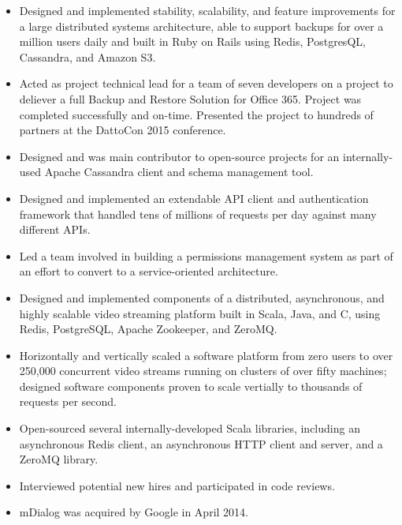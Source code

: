 \documentclass[11pt,a4paper,sans]{moderncv}
\begin{document}
{ \begin{itemize} \itemsep -1pt
  \item Designed and implemented stability, scalability, and feature improvements for a large distributed systems architecture, able to support backups for over a million users daily and built in Ruby on Rails using Redis, PostgresQL, Cassandra, and Amazon S3.
  \item Acted as project technical lead for a team of seven developers on a project to deliever a full Backup and Restore Solution for Office 365. Project was completed successfully and on-time. Presented the project to hundreds of partners at the DattoCon 2015 conference.
  \item Designed and was main contributor to open-source projects for an internally-used Apache Cassandra client and schema management tool.
  \item Designed and implemented an extendable API client and authentication framework that handled tens of millions of requests per day against many different APIs.
  \item Led a team involved in building a permissions management system as part of an effort to convert to a service-oriented architecture.
\end{itemize} }

{ \begin{itemize} \itemsep -1pt
  \item Designed and implemented components of a distributed, asynchronous, and highly scalable video streaming platform built in Scala, Java, and C, using Redis, PostgreSQL, Apache Zookeeper, and ZeroMQ.
  \item Horizontally and vertically scaled a software platform from zero users to over 250,000 concurrent video streams running on clusters of over fifty machines; designed software components proven to scale vertially to thousands of requests per second.
  \item Open-sourced several internally-developed Scala libraries, including an asynchronous Redis client, an asynchronous HTTP client and server, and a ZeroMQ library.
  \item Interviewed potential new hires and participated in code reviews.
  \item mDialog was acquired by Google in April 2014.
\end{itemize} }
\end{document}
